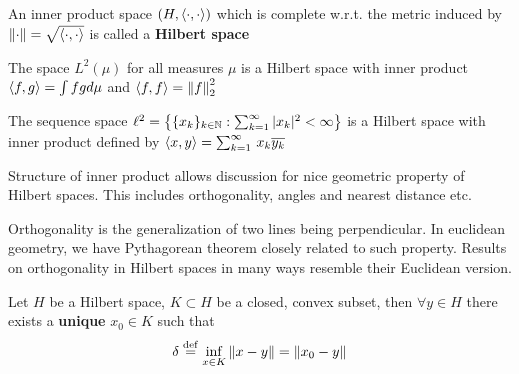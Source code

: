 \documentclass{article}
\begin{document}
\begin{definition}
    An inner product space $(H, \left<{\cdot},{\cdot}\right>)$ which is complete w.r.t. the metric induced by $\left\|{\cdot}\right\|=\sqrt{\left<{\cdot},{\cdot}\right>}$ is called a \textbf{Hilbert space}
\end{definition}

\begin{example}[$L^2-$spaces]
The space $L^2(\mu)$ for all measures $\mu$ is a Hilbert space with inner product $\left<{f},{g}\right>=\int fg d\mu$ and $\left<{f},{f}\right>=\left\|{f}\right\|_2^2$    
\end{example}

\begin{example}[$l^2-$spaces]
The sequence space
	$\ell^2=
		\left\{\{x_k\}_{k\in \mathbb{N}}:\sum_{k=1}^\infty |x_k|^2<\infty \right\}$
	is a Hilbert space with inner product defined by 
	$
		\left<{x},{y}\right>=\sum_{k=1}^\infty \,{x_k \overline{y_k}}
	$
\end{example}

\begin{unexaminable}
Structure of inner product allows discussion for nice geometric property of Hilbert spaces. This includes orthogonality, angles and nearest distance etc.
\end{unexaminable}
\begin{unexaminable}
Orthogonality is the generalization of two lines being perpendicular. In euclidean geometry, we have Pythagorean theorem closely related to such property. Results on orthogonality in Hilbert spaces in many ways resemble their Euclidean version.
\end{unexaminable}

\begin{theorem}
\nextline
\label{nearest point}
	Let $H$ be a Hilbert space, $K\subset H$ be a closed, convex subset, then $\forall y \in H$ there exists a {\bf{unique}} $x_0\in K$ such that
	$$
		\delta \overset{\rm{def}}{=} \inf_{x\in K} \left\|{x-y}\right\| = \left\|{x_0-y}\right\|
	$$
\end{theorem}
\end{document}
